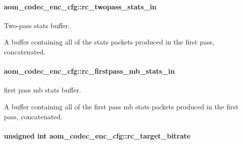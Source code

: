 \paragraph[{\texorpdfstring{rc\+\_\+twopass\+\_\+stats\+\_\+in}{rc_twopass_stats_in}}]{ aom\+\_\+codec\+\_\+enc\+\_\+cfg\+::rc\+\_\+twopass\+\_\+stats\+\_\+in}\hypertarget{structaom__codec__enc__cfg_ad5c6f5c96ec54cabc71edb01045a1f04}{}\label{structaom__codec__enc__cfg_ad5c6f5c96ec54cabc71edb01045a1f04}


Two-\/pass stats buffer. 

A buffer containing all of the stats packets produced in the first pass, concatenated. 
\paragraph[{\texorpdfstring{rc\+\_\+firstpass\+\_\+mb\+\_\+stats\+\_\+in}{rc_firstpass_mb_stats_in}}]{ aom\+\_\+codec\+\_\+enc\+\_\+cfg\+::rc\+\_\+firstpass\+\_\+mb\+\_\+stats\+\_\+in}\hypertarget{structaom__codec__enc__cfg_a3ccdeecb9ed287076f413f088792a4d0}{}\label{structaom__codec__enc__cfg_a3ccdeecb9ed287076f413f088792a4d0}


first pass mb stats buffer. 

A buffer containing all of the first pass mb stats packets produced in the first pass, concatenated. 
\paragraph[{\texorpdfstring{rc\+\_\+target\+\_\+bitrate}{rc_target_bitrate}}]{\setlength{\rightskip}{0pt plus 5cm}unsigned int aom\+\_\+codec\+\_\+enc\+\_\+cfg\+::rc\+\_\+target\+\_\+bitrate}\hypertarget{structaom__codec__enc__cfg_ab21539da477dba7506d90353c27d218b}{}\label{structaom__codec__enc__cfg_ab21539da477dba7506d90353c27d218b}


